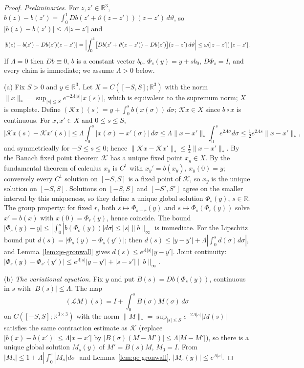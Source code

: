 \documentclass[11pt]{article}
\theoremstyle{definition}
\theoremstyle{plain}
\newcommand{\R}{\mathbb R}
\newcommand{\norm}[1]{\lVert #1\rVert}
\begin{document}
\begin{proof}
\emph{Preliminaries.}  For $z,z'\in\R^3$,
$b(z)-b(z')=\int_0^1Db(z'+\vartheta(z-z'))(z-z')\,d\vartheta$, so
$|b(z)-b(z')|\le\Lambda|z-z'|$ and
\begin{equation}\label{eq:qe-taylor-b}
 |b(z)-b(z')-Db(z')(z-z')|
 =\Bigl|\int_0^1\bigl[Db(z'+\vartheta(z-z'))-Db(z')\bigr](z-z')\,d\vartheta\Bigr|
 \le\omega(|z-z'|)\,|z-z'| .
\end{equation}
If $\Lambda=0$ then $Db\equiv0$, $b$ is a constant vector $b_0$,
$\Phi_s(y)=y+sb_0$, $D\Phi_s=I$, and every claim is immediate; we assume
$\Lambda>0$ below.

(a) Fix $S>0$ and $y\in\R^3$.  Let $X=C([-S,S];\R^3)$ with the norm
$\norm x_*=\sup_{|s|\le S}e^{-2\Lambda|s|}|x(s)|$, which is equivalent to
the supremum norm; $X$ is complete.  Define
$(\mathcal Kx)(s)=y+\int_0^sb(x(\sigma))\,d\sigma$; $\mathcal Kx\in X$ since
$b\circ x$ is continuous.  For $x,x'\in X$ and $0\le s\le S$,
\[
 |\mathcal Kx(s)-\mathcal Kx'(s)|
 \le\Lambda\int_0^s|x(\sigma)-x'(\sigma)|\,d\sigma
 \le\Lambda\norm{x-x'}_*\int_0^se^{2\Lambda\sigma}d\sigma
 \le\tfrac12e^{2\Lambda s}\norm{x-x'}_* ,
\]
and symmetrically for $-S\le s\le0$; hence
$\norm{\mathcal Kx-\mathcal Kx'}_*\le\frac12\norm{x-x'}_*$.  By the Banach
fixed point theorem $\mathcal K$ has a unique fixed point $x_y\in X$.  By
the fundamental theorem of calculus $x_y$ is $C^1$ with $x_y'=b(x_y)$,
$x_y(0)=y$; conversely every $C^1$ solution on $[-S,S]$ is a fixed point of
$\mathcal K$, so $x_y$ is the unique solution on $[-S,S]$.  Solutions on
$[-S,S]$ and $[-S',S']$ agree on the smaller interval by this uniqueness,
so they define a unique global solution $\Phi_s(y)$, $s\in\R$.  The group
property: for fixed $r$, both $s\mapsto\Phi_{s+r}(y)$ and
$s\mapsto\Phi_s(\Phi_r(y))$ solve $x'=b(x)$ with $x(0)=\Phi_r(y)$, hence
coincide.  The bound $|\Phi_s(y)-y|\le|\int_0^s|b(\Phi_\sigma(y))|d\sigma|\le|s|\norm b_\infty$
is immediate.  For the Lipschitz bound put $d(s)=|\Phi_s(y)-\Phi_s(y')|$;
then $d(s)\le|y-y'|+\Lambda|\int_0^sd(\sigma)d\sigma|$, and
Lemma~\ref{lem:qe-gronwall} gives $d(s)\le e^{\Lambda|s|}|y-y'|$.  Joint
continuity: $|\Phi_s(y)-\Phi_{s'}(y')|\le e^{\Lambda|s|}|y-y'|+|s-s'|\norm b_\infty$.

(b) \emph{The variational equation.}  Fix $y$ and put
$B(s)=Db(\Phi_s(y))$, continuous in $s$ with $|B(s)|\le\Lambda$.  The map
\[
 (\mathcal LM)(s)=I+\int_0^sB(\sigma)M(\sigma)\,d\sigma
\]
on $C([-S,S];\R^{3\times3})$ with the norm
$\norm M_*=\sup_{|s|\le S}e^{-2\Lambda|s|}|M(s)|$ satisfies the same contraction estimate as $\mathcal K$ (replace
$|b(x)-b(x')|\le\Lambda|x-x'|$ by $|B(\sigma)(M-M')|\le\Lambda|M-M'|$), so
there is a unique global solution $M_s(y)$ of $M'=B(s)M$, $M_0=I$.  From
$|M_s|\le1+\Lambda|\int_0^s|M_\sigma|d\sigma|$ and
Lemma~\ref{lem:qe-gronwall}, $|M_s(y)|\le e^{\Lambda|s|}$.


\end{proof}
\end{document}
